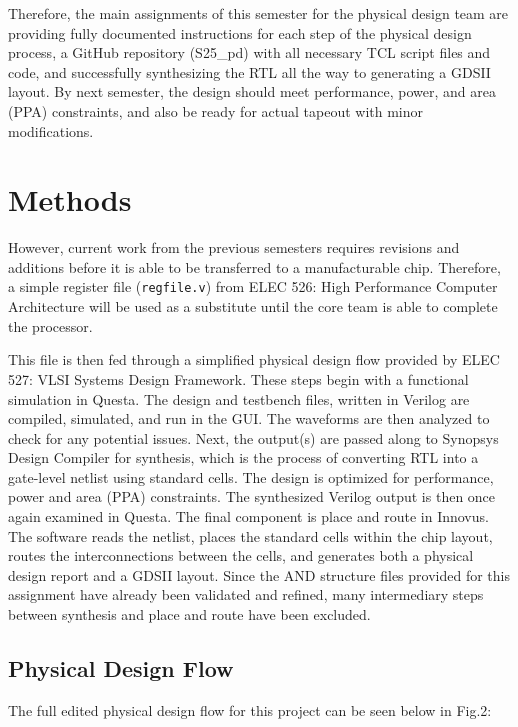 \documentclass[conference]{IEEEtran}
\begin{document}
Therefore, the main assignments of this semester for the physical design team are providing fully documented instructions for each step of the physical design process, a GitHub repository (S25\_pd) with all necessary TCL script files and code, and successfully synthesizing the RTL all the way to generating a GDSII layout. By next semester, the design should meet performance, power, and area (PPA) constraints, and also be ready for actual tapeout with minor modifications.



\section{Methods}
However, current work from the previous semesters requires revisions and additions before it is able to be transferred to a manufacturable chip. Therefore, a simple register file (\texttt{regfile.v}) from ELEC 526: High Performance Computer Architecture will be used as a substitute until the core team is able to complete the processor.

This file is then fed through a simplified physical design flow provided by ELEC 527: VLSI Systems Design Framework. These steps begin with a functional simulation in Questa. The design and testbench files, written in Verilog are compiled, simulated, and run in the GUI. The waveforms are then analyzed to check for any potential issues. Next, the output(s) are passed along to Synopsys Design Compiler for synthesis, which is the process of converting RTL into a gate-level netlist using standard cells. The design is optimized for performance, power and area (PPA) constraints. The synthesized Verilog output is then once again examined in Questa. The final component is place and route in Innovus. The software reads the netlist, places the standard cells within the chip layout, routes the interconnections between the cells, and generates both a physical design report and a GDSII layout. Since the AND structure files provided for this assignment have already been validated and refined, many intermediary steps between synthesis and place and route have been excluded. 

\subsection*{Physical Design Flow}

The full edited physical design flow for this project can be seen below in Fig.2:
\end{document}
